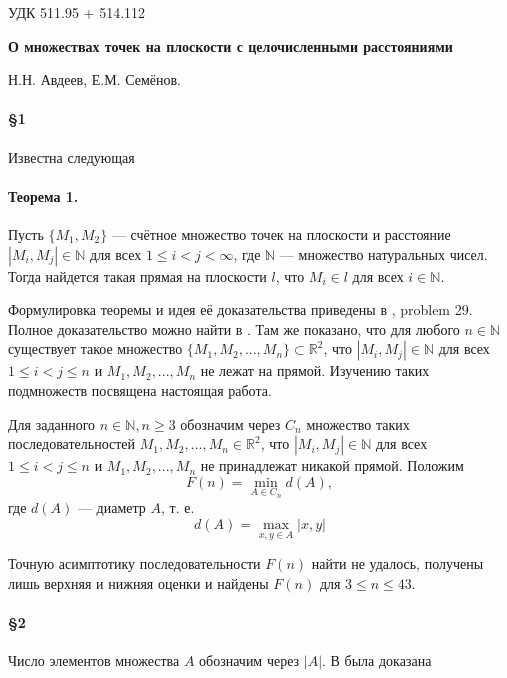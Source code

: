 \documentclass[a4paper,14pt]{article} %
\begin{document}

УДК 511.95 + 514.112

\begin{center}
	\textbf{\LARGE О множествах точек на плоскости с целочисленными расстояниями}

	\vspace{15mm}

	{\Large{Н.Н. Авдеев, Е.М. Семёнов.}}

\end{center}


\paragraph{\S 1} %
Известна следующая

\paragraph{Теорема 1.} Пусть $\{M_1,M_2\}$ --- счётное множество точек на плоскости и расстояние $|M_i,M_j|\in \mathbb{N}$ для всех $1\leq i < j <\infty$, где $\mathbb{N}$ --- множество натуральных чисел. Тогда найдется такая прямая на плоскости $l$, что $M_i\in l$ для всех $i \in \mathbb{N}$.

Формулировка теоремы и идея её доказательства приведены в \cite{Newman}, problem 29. Полное доказательство можно найти в \cite{angem1kurs}.
Там же показано, что для любого $n\in \mathbb{N}$ существует такое множество $\{M_1,M_2,...,M_n\}\subset \mathbb{R}^2$, что $|M_i,M_j|\in\mathbb{N}$ для всех $1\leq i < j  \leq n$ и $M_1, M_2, ..., M_n$ не лежат на прямой.
Изучению таких подмножеств посвящена настоящая работа.


Для заданного $n\in \mathbb{N}, n\geq 3$ обозначим через $C_n$ множество таких последовательностей $M_1,M_2,...,M_n \in \mathbb{R}^2$, что $|M_i,M_j|\in\mathbb{N}$ для всех $1\leq i < j  \leq n$ и  $M_1,M_2,...,M_n$ не принадлежат никакой прямой.
Положим
$$
F(n)=\min\limits_{A\in C_n} d(A),
$$
где $d(A)$ --- диаметр $A$, т. е.
$$
d(A)=\max\limits_{x,y\in A}|x,y|
$$

Точную асимптотику последовательности  $F(n)$ найти не удалось, получены лишь верхняя и нижняя оценки и найдены $F(n)$ для $3\leq n \leq 43$.

\paragraph{\S 2}
Число элементов множества $A$ обозначим через $|A|$.
В \cite{angem1kurs} была доказана
\end{document}
